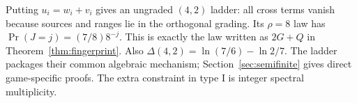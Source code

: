 Putting $u_i=w_i+v_i$ gives an ungraded $(4,2)$ ladder: all cross terms vanish because sources and ranges lie in the orthogonal grading. Its $\rho=8$ law has $\Pr(J=j)=(7/8)8^{-j}$. This is exactly the law written as $2G+Q$ in Theorem~\ref{thm:fingerprint}. Also $\Delta(4,2)=\ln(7/6)-\ln2/7$. The ladder packages their common algebraic mechanism; Section~\ref{sec:semifinite} gives direct game-specific proofs. The extra constraint in type I is integer spectral multiplicity.
